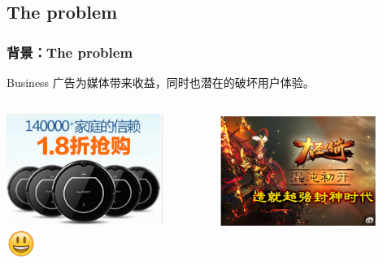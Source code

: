 \documentclass{beamer}
\begin{document}
\subsection{The problem}
\begin{frame}
\frametitle{背景：The problem}

  \begin{block}{Business}
   广告为媒体带来收益，同时也潜在的破坏用户体验。
  \end{block}

  \pause

  \begin{columns}[T]
    \begin{column}{.5\textwidth}
      \begin{center}
        \includegraphics[width=0.8\textwidth]{img/good_ad.png} \\
        \includegraphics[width=0.15\textwidth]{img/emoji_smiley.png}
      \end{center}
    \end{column}
    \begin{column}{.5\textwidth}
      \begin{center}
        \includegraphics[width=0.8\textwidth]{img/bad_ad.png} \\

\end{center}
\end{column}
\end{columns}
\end{frame}
\end{document}
